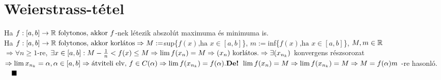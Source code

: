 \documentclass[a4paper,12pt]{article}
\begin{document}
\section{Weierstrass-tétel}
\tetel Ha $ f:[a,b]\to\mathbb{R}\text{ folytonos, akkor } f$-nek
létezik abszolút maximuma és minimuma is.\\[0.1cm]
\biz Ha $ f:[a,b]\to\mathbb{R}\text{ folytonos, akkor korlátos} \\[0.1cm]\Rightarrow 
M:=$sup\{$f(x)\text{,ha } x\in[a,b]$\}, $m:=$inf\{$f(x)\text{,ha }x\in[a,b]$\},
$M,m\in\mathbb{R}$\\[0.1cm] $\Rightarrow\forall n\geq1$-re, $\exists x\in[a,b]:
M -\frac{1}{n}<f(x)\leq M\\[0.1cm]\Rightarrow\lim f(x_n)=M\Rightarrow(x_n)
\text{ korlátos.}\\[0.1cm]\Rightarrow\exists(x_{n_k})$ konvergens részsorozat$ 
\Rightarrow\lim x_{n_k}=\alpha,\alpha\in[a,b]\Rightarrow\text{átviteli elv, }
f\in C(\alpha)\\[0.1cm]\Rightarrow\lim f(x_{n_k})=f(\alpha).\\[0.1cm]
\text{\textbf{De!} }\lim f(x_n)=M\Rightarrow\lim f(x_{n_k})=M\Rightarrow
M=f(\alpha)\\[0.1cm]m$ -re hasonló.$\quad\blacksquare$
\end{document}
